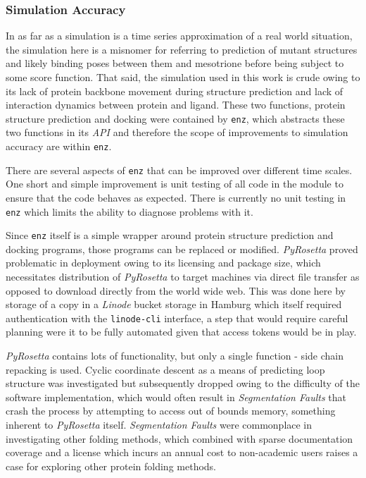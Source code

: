 \documentclass[16pt]{article}
\begin{document}
\subsubsection{Simulation Accuracy}
In as far as a simulation is a time series approximation of a real world situation, the simulation here is a misnomer for referring to prediction of mutant structures and likely binding poses between them and mesotrione before being subject to some score function.
That said, the simulation used in this work is crude owing to its lack of protein backbone movement during structure prediction and lack of interaction dynamics between protein and ligand.
These two functions, protein structure prediction and docking were contained by \texttt{enz}, which abstracts these two functions in its \textit{API} and therefore the scope of improvements to simulation accuracy are within \texttt{enz}.

There are several aspects of \texttt{enz} that can be improved over different time scales.
One short and simple improvement is unit testing of all code in the module to ensure that the code behaves as expected.
There is currently no unit testing in \texttt{enz} which limits the ability to diagnose problems with it.

Since \texttt{enz} itself is a simple wrapper around protein structure prediction and docking programs, those programs can be replaced or modified.
\textit{PyRosetta} proved problematic in deployment owing to its licensing and package size, which necessitates distribution of \textit{PyRosetta} to target machines via direct file transfer as opposed to download directly from the world wide web.
This was done here by storage of a copy in a \textit{Linode} bucket storage in Hamburg which itself required authentication with the \texttt{linode-cli} interface, a step that would require careful planning were it to be fully automated given that access tokens would be in play.

\textit{PyRosetta} contains lots of functionality, but only a single function - side chain repacking \cite{dunbrack1993backbone} is used. 
Cyclic coordinate descent as a means of predicting loop structure \cite{canutescu2003cyclic} was investigated but subsequently dropped owing to the difficulty of the software implementation, which would often result in \textit{Segmentation Faults} that crash the process by attempting to access out of bounds memory, something inherent to \textit{PyRosetta} itself.
\textit{Segmentation Faults} were commonplace in investigating other folding methods, which combined with sparse documentation coverage and a license which incurs an annual cost to non-academic users raises a case for exploring other protein folding methods.
\end{document}
